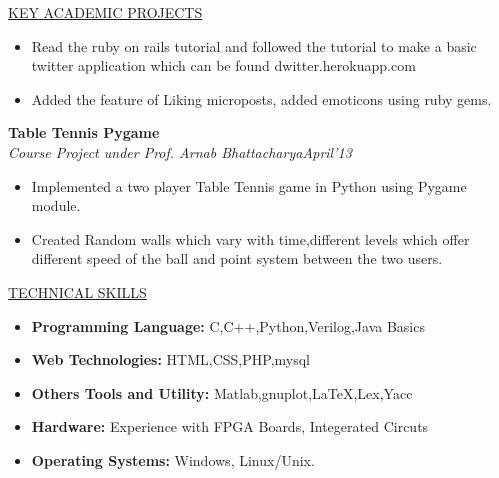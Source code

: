 \documentclass[10pt]{res}
\begin{document}
\begin{resume}
\begin{section}{\underline{KEY ACADEMIC PROJECTS}}
\begin{itemize}
\item{
Read the ruby on rails tutorial and followed the tutorial to make a basic twitter application which can be found dwitter.herokuapp.com
}
\item{
Added the feature of Liking microposts, added emoticons using ruby gems.
}
\end{itemize}
{\bf Table Tennis Pygame}\\
\textit{Course Project under Prof. Arnab Bhattacharya\hfill April'13}
\vspace{0.1in}
\begin{itemize}
\item{
Implemented a two player Table Tennis game in Python using Pygame module.
}
\item{
Created Random walls which vary with time,different levels which offer different speed of the ball and point system between the two users.
}
\end{itemize}
\end{section}




\begin{section}{\underline{TECHNICAL SKILLS}}
\begin{itemize}
\item{
{\bf Programming Language:}  C,C++,Python,Verilog,Java Basics
}
\item{
{\bf Web Technologies:}  HTML,CSS,PHP,mysql
}
\item{
{\bf Others Tools and Utility:}  Matlab,gnuplot,LaTeX,Lex,Yacc
}
\item{
{\bf Hardware:} Experience with FPGA Boards, Integerated Circuts
}
\item{
{\bf Operating Systems:} Windows, Linux/Unix.
}
\end{itemize}
\end{section}


\end{resume}
\end{document}
